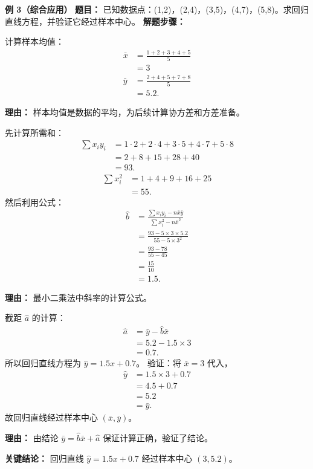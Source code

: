 \begin{examplebox}
	\medskip
	\textbf{\textcolor{CExample}{例 3（综合应用）}}
	\textbf{\textcolor{CExample}{题目：}}
	已知数据点：(1,2)，(2,4)，(3,5)，(4,7)，(5,8)。求回归直线方程，并验证它经过样本中心。
	\textbf{\textcolor{CExample}{解题步骤：}}
	\begin{description}[style=nextline, leftmargin=2.8em, labelsep=0.5em, itemsep=0.45em]
		\item[\textbf{第一步（计算均值）：}]
			计算样本均值：
			\[
				\begin{aligned}
					\bar{x} &= \frac{1+2+3+4+5}{5} \\ &= 3 \\ \bar{y} &= \frac{2+4+5+7+8}{5} \\ &= 5.2.
			\end{aligned}
			\]
			\par\textbf{理由：} 样本均值是数据的平均，为后续计算协方差和方差准备。
		\item[\textbf{第二步（计算斜率）：}]
			先计算所需和：
			\[
				\begin{aligned}
					\sum x_i y_i &= 1\cdot2+2\cdot4+3\cdot5+4\cdot7+5\cdot8 \\ &= 2+8+15+28+40 \\ &= 93.
			\end{aligned}
			\]
			\[
				\begin{aligned}
					\sum x_i^2 &= 1+4+9+16+25 \\ &= 55.
			\end{aligned}
			\]
			然后利用公式：
			\[
				\begin{aligned}
					\hat{b} &= \frac{\sum x_i y_i - n\bar{x}\bar{y}}{\sum x_i^2 - n\bar{x}^2} \\ &= \frac{93 - 5\times3\times5.2}{55 - 5\times3^2} \\ &= \frac{93-78}{55-45} \\ &= \frac{15}{10} \\ &= 1.5.
			\end{aligned}
			\]
			\par\textbf{理由：} 最小二乘法中斜率的计算公式。
		\item[\textbf{第三步（求截距并验证）：}]
			截距 $\hat{a}$ 的计算：
			\[
				\begin{aligned}
					\hat{a} &= \bar{y} - \hat{b}\bar{x} \\ &= 5.2 - 1.5\times3 \\ &= 0.7.
			\end{aligned}
			\]
			所以回归直线方程为 $\hat{y}=1.5x+0.7$。 验证：将 $\bar{x}=3$ 代入，
			\[
				\begin{aligned}
					\hat{y} &= 1.5\times3+0.7 \\ &= 4.5+0.7 \\ &= 5.2 \\ &= \bar{y}.
			\end{aligned}
			\]
			故回归直线经过样本中心 $(\bar{x},\bar{y})$。
			\par\textbf{理由：} 由结论 $\bar{y} = \hat{b}\bar{x} + \hat{a}$ 保证计算正确，验证了结论。
	\end{description}
	\textbf{\textcolor{CExample}{关键结论：}}
	回归直线 $\hat{y}=1.5x+0.7$ 经过样本中心 $(3,5.2)$。
\end{examplebox}
